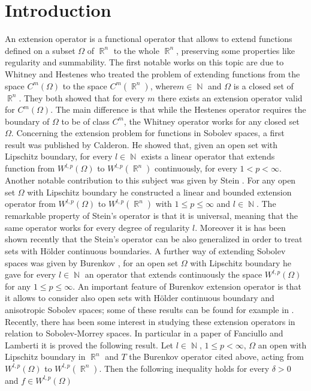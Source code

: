 \documentclass[12pt]{article}
\theoremstyle{definition}
\DeclareMathOperator\rr{\mathbb{R}}
\DeclareMathOperator\nn{\mathbb{N}}
\begin{document}
\section{Introduction}
An extension operator is a functional operator that allows to extend functions defined on a subset $\Omega$ of $\rr^n$ to the whole $\rr^n$, preserving some properties like regularity and summability. The first notable works on this topic are due to Whitney\cite{whitney1,whitney2} and Hestenes\cite{hestenes} who treated the problem of extending functions from the space $C^m(\Omega)$ to the space $C^m(\rr^n)$, where$m\in\nn $ and $\Omega$ is a closed set of $\rr^n$. They both showed that for every $m$ there exists an extension operator valid for $C^m(\Omega)$. The main difference is that while the Hestenes operator requires the boundary of $\Omega$ to be of class $C^m$, the Whitney operator works for any closed set $\Omega.$ Concerning the extension problem for functions in Sobolev spaces, a first result was published by Calderon\cite{calderon}. He showed that, given an open set with Lipschitz boundary, for every $l \in \nn$ exists a linear operator that extends function from $W^{l,p}(\Omega)$ to $W^{l,p}(\rr^n)$ continuously, for every $1<p<\infty$. Another notable contribution to this subject was given by Stein \cite{stein}. For any open set $\Omega$ with Lipschitz boundary he constructed a linear and bounded extension operator from $W^{l,p}(\Omega)$ to $W^{l,p}(\rr^n)$ with $1\le p\le \infty$ and $l \in \nn$. The remarkable property of Stein's operator is that it is universal, meaning that the same operator works for every degree of regularity $l$. Moreover it is has been shown recently \cite{frerick} that the Stein's operator can be also generalized in order to treat sets with Hölder continuous boundaries. A further way of extending Sobolev spaces was given by Burenkov \cite{burenkov}, for an open set $\Omega$ with Lipschitz boundary he gave for every $l\in \nn$ an operator that extends continuously the space $W^{l,p}(\Omega)$ for any $1\le p\le \infty$. An important feature of Burenkov extension operator is that it allows to consider also open sets with Hölder continuous boundary and anisotropic Sobolev spaces; some of these results can be found for example in \cite{burenkov2}.  \\Recently, there has been some interest in studying these extension operators in relation to Sobolev-Morrey spaces. In particular in a paper of Fanciullo and Lamberti\cite{lamberti} it is proved the following result. Let $l\in \nn$, $1\le p<\infty$, $\Omega$ an open with Lipschitz boundary in $\rr^n$ and $T$ the Burenkov operator cited above, acting from $W^{l,p}(\Omega)$ to $W^{l,p}(\rr^n)$. Then the following inequality holds for every $\delta>0$ and $f \in W^{l,p}(\Omega)$
\end{document}
